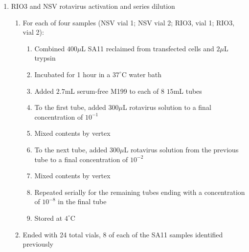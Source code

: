 \begin{enumerate}
	\item RIO3 and NSV rotavirus activation and series dilution
		\begin{enumerate}
			\item For each of four samples (NSV vial 1; NSV vial 2; RIO3, vial 1; RIO3, vial 2):
				\begin{enumerate}
					\item Combined $400\mu$L SA11 reclaimed from transfected cells and $2\mu$L trypsin
					\item Incubated for 1 hour in a $37^{\circ}$C water bath
					\item Added $2.7$mL serum-free M199 to each of 8 $15$mL tubes
					\item To the first tube, added $300\mu$L rotavirus solution to a final concentration of $10^{-1}$
					\item Mixed contents by vertex
					\item To the next tube, added $300\mu$L rotavirus solution from the previous tube to a final concentration of $10^{-2}$
					\item Mixed contents by vertex
					\item Repeated serially for the remaining tubes ending with a concentration of $10^{-8}$ in the final tube
					\item Stored at $4^{\circ}$C
				\end{enumerate}
			\item Ended with 24 total vials, 8 of each of the SA11 samples identified previously
		\end{enumerate}
\end{enumerate}

%
% 

